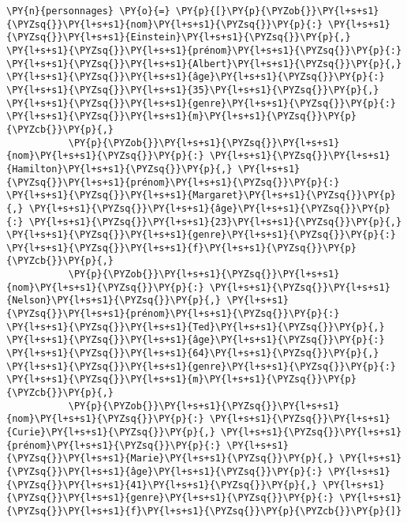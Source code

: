 \documentclass[12pt]{book}
\begin{document}
    \begin{tcolorbox}[breakable, size=fbox, boxrule=1pt, pad at break*=1mm,colback=cellbackground, colframe=cellborder]
\begin{Verbatim}[commandchars=\\\{\}]
\PY{n}{personnages} \PY{o}{=} \PY{p}{[}\PY{p}{\PYZob{}}\PY{l+s+s1}{\PYZsq{}}\PY{l+s+s1}{nom}\PY{l+s+s1}{\PYZsq{}}\PY{p}{:} \PY{l+s+s1}{\PYZsq{}}\PY{l+s+s1}{Einstein}\PY{l+s+s1}{\PYZsq{}}\PY{p}{,} \PY{l+s+s1}{\PYZsq{}}\PY{l+s+s1}{prénom}\PY{l+s+s1}{\PYZsq{}}\PY{p}{:} \PY{l+s+s1}{\PYZsq{}}\PY{l+s+s1}{Albert}\PY{l+s+s1}{\PYZsq{}}\PY{p}{,} \PY{l+s+s1}{\PYZsq{}}\PY{l+s+s1}{âge}\PY{l+s+s1}{\PYZsq{}}\PY{p}{:} \PY{l+s+s1}{\PYZsq{}}\PY{l+s+s1}{35}\PY{l+s+s1}{\PYZsq{}}\PY{p}{,} \PY{l+s+s1}{\PYZsq{}}\PY{l+s+s1}{genre}\PY{l+s+s1}{\PYZsq{}}\PY{p}{:} \PY{l+s+s1}{\PYZsq{}}\PY{l+s+s1}{m}\PY{l+s+s1}{\PYZsq{}}\PY{p}{\PYZcb{}}\PY{p}{,}
           \PY{p}{\PYZob{}}\PY{l+s+s1}{\PYZsq{}}\PY{l+s+s1}{nom}\PY{l+s+s1}{\PYZsq{}}\PY{p}{:} \PY{l+s+s1}{\PYZsq{}}\PY{l+s+s1}{Hamilton}\PY{l+s+s1}{\PYZsq{}}\PY{p}{,} \PY{l+s+s1}{\PYZsq{}}\PY{l+s+s1}{prénom}\PY{l+s+s1}{\PYZsq{}}\PY{p}{:} \PY{l+s+s1}{\PYZsq{}}\PY{l+s+s1}{Margaret}\PY{l+s+s1}{\PYZsq{}}\PY{p}{,} \PY{l+s+s1}{\PYZsq{}}\PY{l+s+s1}{âge}\PY{l+s+s1}{\PYZsq{}}\PY{p}{:} \PY{l+s+s1}{\PYZsq{}}\PY{l+s+s1}{23}\PY{l+s+s1}{\PYZsq{}}\PY{p}{,} \PY{l+s+s1}{\PYZsq{}}\PY{l+s+s1}{genre}\PY{l+s+s1}{\PYZsq{}}\PY{p}{:} \PY{l+s+s1}{\PYZsq{}}\PY{l+s+s1}{f}\PY{l+s+s1}{\PYZsq{}}\PY{p}{\PYZcb{}}\PY{p}{,}
           \PY{p}{\PYZob{}}\PY{l+s+s1}{\PYZsq{}}\PY{l+s+s1}{nom}\PY{l+s+s1}{\PYZsq{}}\PY{p}{:} \PY{l+s+s1}{\PYZsq{}}\PY{l+s+s1}{Nelson}\PY{l+s+s1}{\PYZsq{}}\PY{p}{,} \PY{l+s+s1}{\PYZsq{}}\PY{l+s+s1}{prénom}\PY{l+s+s1}{\PYZsq{}}\PY{p}{:} \PY{l+s+s1}{\PYZsq{}}\PY{l+s+s1}{Ted}\PY{l+s+s1}{\PYZsq{}}\PY{p}{,} \PY{l+s+s1}{\PYZsq{}}\PY{l+s+s1}{âge}\PY{l+s+s1}{\PYZsq{}}\PY{p}{:} \PY{l+s+s1}{\PYZsq{}}\PY{l+s+s1}{64}\PY{l+s+s1}{\PYZsq{}}\PY{p}{,} \PY{l+s+s1}{\PYZsq{}}\PY{l+s+s1}{genre}\PY{l+s+s1}{\PYZsq{}}\PY{p}{:} \PY{l+s+s1}{\PYZsq{}}\PY{l+s+s1}{m}\PY{l+s+s1}{\PYZsq{}}\PY{p}{\PYZcb{}}\PY{p}{,}
           \PY{p}{\PYZob{}}\PY{l+s+s1}{\PYZsq{}}\PY{l+s+s1}{nom}\PY{l+s+s1}{\PYZsq{}}\PY{p}{:} \PY{l+s+s1}{\PYZsq{}}\PY{l+s+s1}{Curie}\PY{l+s+s1}{\PYZsq{}}\PY{p}{,} \PY{l+s+s1}{\PYZsq{}}\PY{l+s+s1}{prénom}\PY{l+s+s1}{\PYZsq{}}\PY{p}{:} \PY{l+s+s1}{\PYZsq{}}\PY{l+s+s1}{Marie}\PY{l+s+s1}{\PYZsq{}}\PY{p}{,} \PY{l+s+s1}{\PYZsq{}}\PY{l+s+s1}{âge}\PY{l+s+s1}{\PYZsq{}}\PY{p}{:} \PY{l+s+s1}{\PYZsq{}}\PY{l+s+s1}{41}\PY{l+s+s1}{\PYZsq{}}\PY{p}{,} \PY{l+s+s1}{\PYZsq{}}\PY{l+s+s1}{genre}\PY{l+s+s1}{\PYZsq{}}\PY{p}{:} \PY{l+s+s1}{\PYZsq{}}\PY{l+s+s1}{f}\PY{l+s+s1}{\PYZsq{}}\PY{p}{\PYZcb{}}\PY{p}{]}
\end{Verbatim}
\end{tcolorbox}
\end{document}
